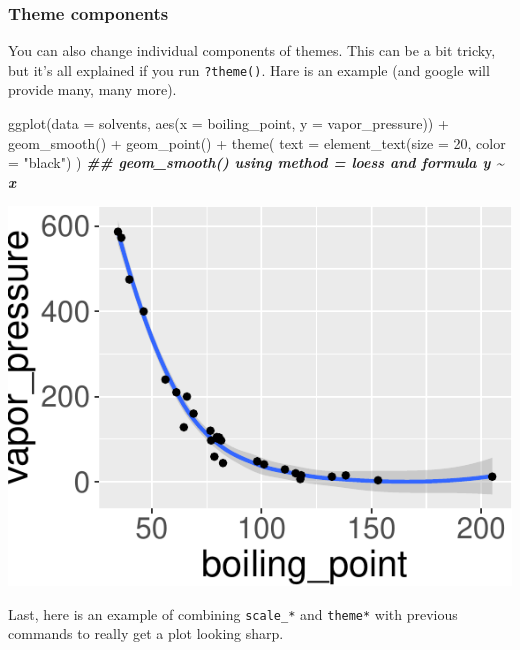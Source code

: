 \documentclass[
]{krantz}
\newenvironment{Shaded}{\begin{snugshade}}{\end{snugshade}}
\newcommand{\AttributeTok}[1]{\textcolor[rgb]{0.77,0.63,0.00}{#1}}
\newcommand{\DecValTok}[1]{\textcolor[rgb]{0.00,0.00,0.81}{#1}}
\newcommand{\DocumentationTok}[1]{\textcolor[rgb]{0.56,0.35,0.01}{\textbf{\textit{#1}}}}
\newcommand{\FunctionTok}[1]{\textcolor[rgb]{0.00,0.00,0.00}{#1}}
\newcommand{\NormalTok}[1]{#1}
\newcommand{\SpecialCharTok}[1]{\textcolor[rgb]{0.00,0.00,0.00}{#1}}
\newcommand{\StringTok}[1]{\textcolor[rgb]{0.31,0.60,0.02}{#1}}
\begin{document}
\hypertarget{theme-components}{%
\subsubsection{Theme components}\label{theme-components}}

You can also change individual components of themes. This can be a bit tricky, but it's all explained if you run \texttt{?theme()}. Hare is an example (and google will provide many, many more).

\begin{Shaded}
\begin{Highlighting}[]
\FunctionTok{ggplot}\NormalTok{(}\AttributeTok{data =}\NormalTok{ solvents, }\FunctionTok{aes}\NormalTok{(}\AttributeTok{x =}\NormalTok{ boiling\_point, }\AttributeTok{y =}\NormalTok{ vapor\_pressure)) }\SpecialCharTok{+} 
  \FunctionTok{geom\_smooth}\NormalTok{() }\SpecialCharTok{+}
  \FunctionTok{geom\_point}\NormalTok{() }\SpecialCharTok{+}
  \FunctionTok{theme}\NormalTok{(}
    \AttributeTok{text =} \FunctionTok{element\_text}\NormalTok{(}\AttributeTok{size =} \DecValTok{20}\NormalTok{, }\AttributeTok{color =} \StringTok{"black"}\NormalTok{)}
\NormalTok{  )}
\DocumentationTok{\#\# \textasciigrave{}geom\_smooth()\textasciigrave{} using method = \textquotesingle{}loess\textquotesingle{} and formula \textquotesingle{}y \textasciitilde{} x\textquotesingle{}}
\end{Highlighting}
\end{Shaded}

\begin{center}\includegraphics[width=0.8\linewidth]{index_files/figure-latex/unnamed-chunk-66-1} \end{center}

Last, here is an example of combining \texttt{scale\_*} and \texttt{theme*} with previous commands to really get a plot looking sharp.
\end{document}
